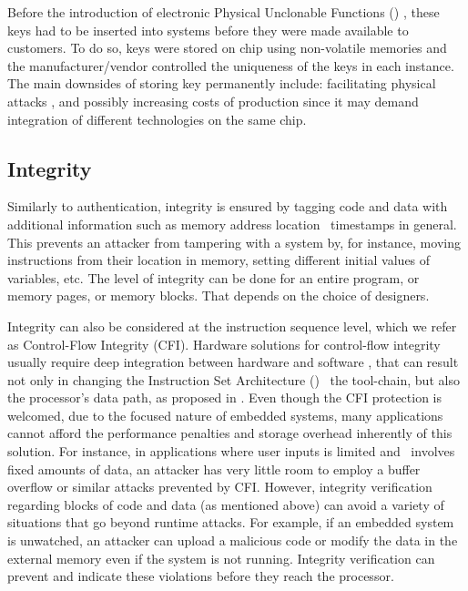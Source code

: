 Before the introduction of electronic Physical Unclonable Functions (\pufs) \cite{Gassend2002:PUFs}, these keys had to be inserted into systems before they were made available to customers. To do so, keys were stored on chip using non-volatile memories and the manufacturer\slash{}vendor controlled the uniqueness of the keys in each instance. The main downsides of storing key permanently include: facilitating physical attacks \cite{Sadeghi2010:Security-PUFs}, and possibly increasing costs of production since it may demand integration of different technologies on the same chip.



\subsection{Integrity}
\label{subsec:Integrity}

Similarly to authentication, integrity is ensured by tagging code and data with additional information such as memory address location \andor~timestamps in general. This prevents an attacker from tampering with a system by, for instance, moving instructions from their location in memory, setting different initial values of variables, etc. The level of integrity can be done for an entire program, or memory pages, or memory blocks. That depends on the choice of designers.

Integrity can also be considered at the instruction sequence level, which we refer as Control-Flow Integrity (CFI). Hardware solutions for control-flow integrity usually require deep integration between hardware and software \cite{Davi2015:HAFIX}, that can result not only in changing the Instruction Set Architecture (\isa) \andor~the tool-chain, but also the processor's data path, as proposed in \cite{Gelbart2005:CODESSEAL, Kanuparthi2012:DynamicIntegrity}. Even though the CFI protection is welcomed, due to the focused nature of embedded systems, many applications cannot afford the performance penalties and storage overhead inherently of this solution. For instance, in applications where user inputs is limited and \io~involves fixed amounts of data, an attacker has very little room to employ a buffer overflow or similar attacks prevented by CFI. However, integrity verification regarding blocks of code and data (as mentioned above) can avoid a variety of situations that go beyond runtime attacks. For example, if an embedded system is unwatched, an attacker can upload a malicious code or modify the data in the external memory even if the system is not running. Integrity verification can prevent and indicate these violations before they reach the processor.

